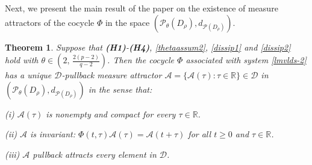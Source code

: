 \documentclass[11pt]{article}
\numberwithin{equation}{section}
\theoremstyle{plain}
\newtheorem{theorem}{Theorem}[section]
\begin{document}
 
 
 Next, we 
 present the  main result
 of the paper  on 
 the existence of 
 measure attractors
  of 
  the cocycle
  $ \Phi$ in
  the space  $(\mathcal{P}_{\theta}(D_{\rho}),
  d_{\mathcal{P}( D_{\rho})})$.

\begin{theorem}\label{pis}
   Suppose that {\bf(H1)}-{\bf(H4)}, \eqref{thetaassum2}, \eqref{dissip1} and \eqref{dissip2} hold
   with  $\theta \in \left(2,\, \tfrac{2(p-2)}{q-2}\right)$.
   Then 
   the cocycle $ \Phi $ associated with
   system  \eqref{lmvlds-2} has
   a unique $\mathcal{D}$-pullback measure attractor
   $\mathcal{A} = \{ \mathcal{A}(\tau) : \tau \in \mathbb{R} \} \in \mathcal{D}$ 
   in   $(\mathcal{P}_{\theta}(D_{\rho}),
  d_{\mathcal{P}( D_{\rho})})$
  in the sense that:
  
   (i)   $\mathcal{A}(\tau)$ is nonempty and
   compact for every
   $ \tau \in \mathbb{R}$.
   
   (ii)  {$ \mathcal{A} $ is invariant:
   $\Phi (t, \tau )  \mathcal{A}(\tau) 
   = \mathcal{A}(t+ \tau)$ for all $t \ge 0$
   and $\tau \in \mathbb{R}$. }
   
   (iii) $ \mathcal{A} $ pullback  attracts   every element in $\mathcal{D}$.
   
   
\end{theorem}
\end{document}
